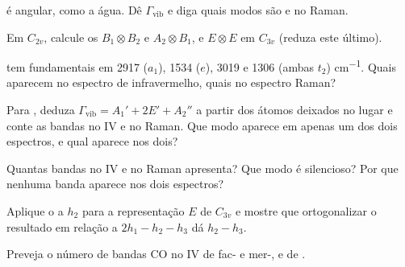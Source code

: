 \begin{exercise}[$\star$]\label{exo:b3:group-theory-applied:2}
 é angular, como a água. Dê $\Gamma_{\mathrm{vib}}$ e diga quais modos são
 e no Raman.
\end{exercise}

\begin{exercise}[$\star$]\label{exo:b3:group-theory-applied:3}
Em $C_{2v}$, calcule os  $B_1\otimes B_2$ e $A_2\otimes B_1$, e
$E\otimes E$ em $C_{3v}$ (reduza este último).
\end{exercise}

\begin{exercise}[$\star$]\label{exo:b3:group-theory-applied:4}
 tem fundamentais em 2917 ($a_1$), 1534 ($e$), 3019 e 1306 (ambas $t_2$)
\unit{cm^{-1}}. Quais aparecem no espectro de infravermelho, quais no espectro
Raman?
\end{exercise}

\begin{exercise}[$\star\star$]\label{exo:b3:group-theory-applied:5}
Para , deduza $\Gamma_{\mathrm{vib}} = A_1' + 2E' + A_2''$ a partir dos átomos
deixados no lugar e conte as bandas no IV e no Raman. Que modo aparece em
apenas um dos dois espectros, e qual aparece nos dois?
\end{exercise}

\begin{exercise}[$\star\star$]\label{exo:b3:group-theory-applied:6}
Quantas bandas no IV e no Raman  apresenta? Que modo é silencioso? Por
que nenhuma banda aparece nos dois espectros?
\end{exercise}

\begin{exercise}[$\star\star$]\label{exo:b3:group-theory-applied:7}
Aplique o  a $h_2$ para a representação $E$ de $C_{3v}$ e
mostre que ortogonalizar o resultado em relação a $2h_1 - h_2 - h_3$ dá $h_2 - h_3$.
\end{exercise}

\begin{exercise}[$\star\star$]\label{exo:b3:group-theory-applied:8}
Preveja o número de bandas CO no IV de fac- e mer-, e de
.
\end{exercise}

